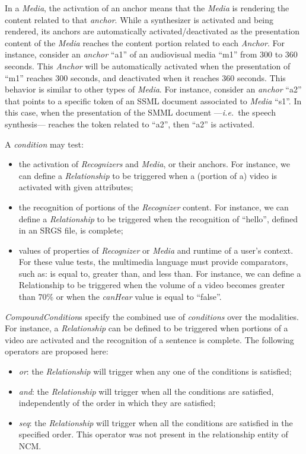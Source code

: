 \documentclass[
  doutorado,
  american
]{ThesisPUC}
\begin{document}
In a \textit{Media}, the activation of an anchor means that the \textit{Media}
is rendering the content related to that \textit{anchor}. While a synthesizer is
activated and being rendered, its anchors are automatically
activated/deactivated as the presentation content of the \textit{Media} reaches
the content portion related to each 
\textit{Anchor}. For instance, consider an \textit{anchor} “a1” of an
audiovisual media “m1” from 300 to 360 seconds. This \textit{Anchor} will be
automatically activated when the presentation of “m1” reaches 300 seconds, and
deactivated when it reaches 360 seconds. This behavior is similar to other types
of \textit{Media}. For instance, consider an \textit{anchor} “a2” that points to
a specific token of an SSML document associated to \textit{Media} “s1”. In 
this case, when the presentation of the SMML document —\textit{i.e.}~the speech 
synthesis— reaches the token related to “a2”, then “a2” is activated.

A \textit{condition} may test:

\begin{itemize}	
	\item the activation of \textit{Recognizers} and \textit{Media}, or their
	anchors. For instance, we can define a \textit{Relationship} to be triggered
	when a (portion of a) video is activated with given attributes;
	\item the recognition of portions of the \textit{Recognizer} content. For
	instance, we can define a \textit{Relationship} to be triggered when the
	recognition of “hello”, defined in an SRGS file, is complete;
	\item values of properties of \textit{Recognizer} or \textit{Media} and
	runtime of a user’s context. For these value tests, the multimedia language
	must provide comparators, such as: is equal to, greater than, and less than.
	For instance, we can define a Relationship to be triggered when the volume of a video becomes greater than 70\% or when the \textit{canHear} value is equal to “false”.
\end{itemize}	

\textit{CompoundCondition}s specify the combined use of \textit{conditions} over
the modalities. For instance, a \textit{Relationship} can be defined to be
triggered when portions of a video are activated and the recognition of a
sentence is complete. The following operators are proposed here:

\begin{itemize}	
	\item \textit{or}: the \textit{Relationship} will trigger when any one of the
	conditions is satisfied;
	\item \textit{and}: the \textit{Relationship} will trigger when all the
	conditions are satisfied, independently of the order in which they are
	satisfied; 
	\item \textit{seq}: the \textit{Relationship} will trigger when all the
	conditions are satisfied in the specified order. This operator was not present in the relationship entity of NCM.
\end{itemize}	
\end{document}
